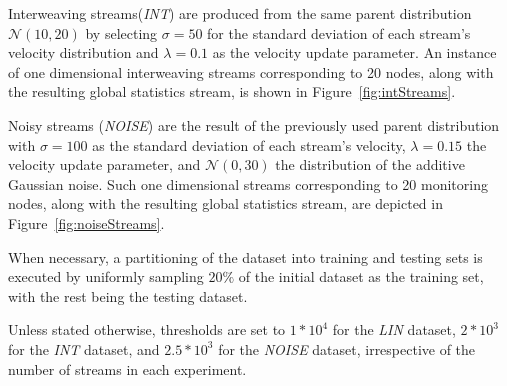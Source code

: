 Interweaving streams(\emph{INT}) are produced from the same parent distribution $\mathcal{N}(10,20)$ by selecting $\sigma=50$ for the standard deviation of each stream's velocity distribution and $\lambda=0.1$ as the velocity update parameter. An instance of one dimensional interweaving streams corresponding to 20 nodes, along with the resulting global statistics stream, is shown in Figure~\ref{fig:intStreams}.

Noisy streams (\emph{NOISE}) are the result of the previously used parent distribution with $\sigma=100$ as the standard deviation of each stream's velocity, $\lambda=0.15$ the velocity update parameter, and  $\mathcal{N}(0,30)$ the distribution of the additive Gaussian noise. Such one dimensional streams corresponding to 20 monitoring nodes, along with the resulting global statistics stream, are depicted in Figure~\ref{fig:noiseStreams}.

When necessary, a partitioning of the dataset into training and testing sets is executed by uniformly sampling $20\%$ of the initial dataset as the training set, with the rest being the testing dataset. 

Unless stated otherwise, thresholds are set to $1*10^4$ for the \emph{LIN} dataset, $2*10^3$ for the \emph{INT} dataset, and $2.5*10^3$ for the \emph{NOISE} dataset, irrespective of the number of streams in each experiment. 

